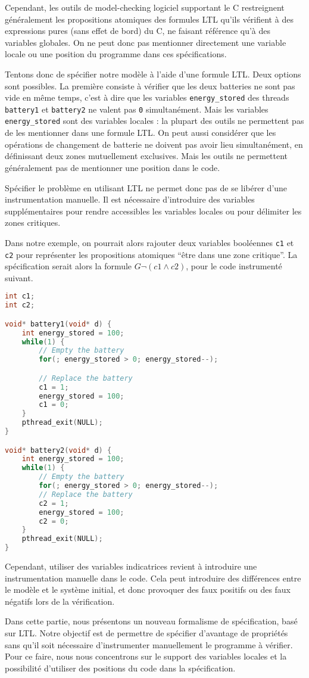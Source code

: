 Cependant, les outils de model-checking logiciel supportant le C restreignent
généralement les propositions atomiques des formules LTL qu'ils vérifient à des
expressions pures (sans effet de bord) du C, ne faisant référence qu'à des
variables globales. On ne peut donc pas mentionner directement une variable
locale ou une position du programme dans ces spécifications.

Tentons donc de spécifier notre modèle à l'aide d'une formule LTL. Deux
options sont possibles. La première consiste à vérifier que les deux
batteries ne sont pas vide en même temps, c'est à dire que les variables
\lstinline!energy_stored! des threads \lstinline!battery1! et
\lstinline!battery2! ne valent pas \lstinline!0! simultanément. Mais les
variables \lstinline!energy_stored! sont des variables locales : la
plupart des outils ne permettent pas de les mentionner dans une formule
LTL. On peut aussi considérer que les opérations de changement de
batterie ne doivent pas avoir lieu simultanément, en définissant deux
zones mutuellement exclusives. Mais les outils ne permettent
généralement pas de mentionner une position dans le code.

Spécifier le problème en utilisant LTL ne permet donc pas de se libérer
d'une instrumentation manuelle. Il est nécessaire d'introduire des
variables supplémentaires pour rendre accessibles les variables locales
ou pour délimiter les zones critiques.

Dans notre exemple, on pourrait alors rajouter deux variables booléennes
\lstinline!c1! et \lstinline!c2! pour représenter les propositions atomiques
``être dans une zone critique''. La spécification serait alors
la formule \(G \lnot (c1 \land c2)\), pour le code instrumenté suivant.

\begin{lstlisting}[language=C]
int c1;
int c2;

void* battery1(void* d) {
    int energy_stored = 100;
    while(1) {
        // Empty the battery
        for(; energy_stored > 0; energy_stored--);

        // Replace the battery
        c1 = 1;
        energy_stored = 100;
        c1 = 0;
    }
    pthread_exit(NULL);
}

void* battery2(void* d) {
    int energy_stored = 100;
    while(1) {
        // Empty the battery
        for(; energy_stored > 0; energy_stored--);
        // Replace the battery
        c2 = 1;
        energy_stored = 100;
        c2 = 0;
    }
    pthread_exit(NULL);
}
\end{lstlisting}

Cependant, utiliser des variables indicatrices revient à introduire une
instrumentation manuelle dans le code. Cela peut introduire des
différences entre le modèle et le système initial, et donc provoquer des
faux positifs ou des faux négatifs lors de la vérification.

Dans cette partie, nous présentons un nouveau formalisme de spécification, basé
sur LTL. Notre objectif est de permettre de spécifier d'avantage de propriétés
sans qu'il soit nécessaire d'instrumenter manuellement le programme à vérifier.
Pour ce faire, nous nous concentrons sur le support des variables locales et la
possibilité d'utiliser des positions du code dans la spécification.